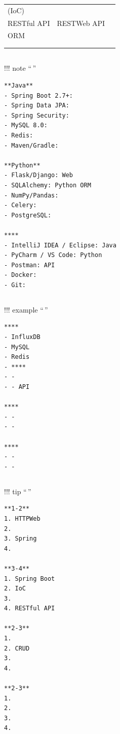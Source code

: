 \begin{longtable}[]{@{}lll@{}}
\toprule\noalign{}
\endhead
\bottomrule\noalign{}
\endlastfoot
(IoC) & & \\
RESTful API & RESTWeb API & \\
ORM & & \\
& & \\
& & \\
\end{longtable}

\subsection{}\label{section-4}

!!! note ``\,''

\begin{verbatim}
**Java**
- Spring Boot 2.7+: 
- Spring Data JPA: 
- Spring Security: 
- MySQL 8.0: 
- Redis: 
- Maven/Gradle: 

**Python**
- Flask/Django: Web
- SQLAlchemy: Python ORM
- NumPy/Pandas: 
- Celery: 
- PostgreSQL: 

****
- IntelliJ IDEA / Eclipse: Java
- PyCharm / VS Code: Python
- Postman: API
- Docker: 
- Git: 
\end{verbatim}

\subsection{}\label{section-5}

!!! example ``\,''

\begin{verbatim}
****
- InfluxDB
- MySQL
- Redis
- ****
- - 
- - API

****
- - 
- - 

****
- - 
- - 
\end{verbatim}

\subsection{}\label{section-6}

!!! tip ``\,''

\begin{verbatim}
**1-2**
1. HTTPWeb
2. 
3. Spring
4. 

**3-4**
1. Spring Boot
2. IoC
3. 
4. RESTful API

**2-3**
1. 
2. CRUD
3. 
4. 

**2-3**
1. 
2. 
3. 
4. 
\end{verbatim}

